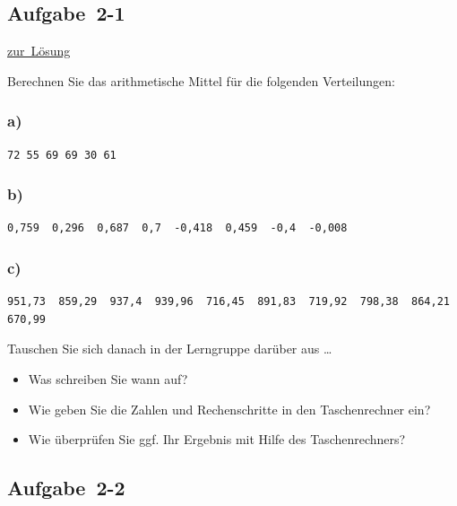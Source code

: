 \documentclass[
  11pt,
  ngerman,
  a4paper,
]{report}
\providecommand{\tightlist}{%
  \setlength{\itemsep}{0pt}\setlength{\parskip}{0pt}}
\begin{document}
\hypertarget{aufgabe-2-1}{%
\subsection{Aufgabe~2-1}\label{aufgabe-2-1}}

\protect\hyperlink{loesung-2-1}{zur~Lösung}

Berechnen Sie das arithmetische Mittel für die folgenden Verteilungen:

\hypertarget{a}{%
\subsubsection{a)}\label{a}}

\begin{verbatim}
72 55 69 69 30 61
\end{verbatim}

\hypertarget{b}{%
\subsubsection{b)}\label{b}}

\begin{verbatim}
0,759  0,296  0,687  0,7  -0,418  0,459  -0,4  -0,008
\end{verbatim}

\hypertarget{c}{%
\subsubsection{c)}\label{c}}

\begin{verbatim}
951,73  859,29  937,4  939,96  716,45  891,83  719,92  798,38  864,21  670,99
\end{verbatim}

Tauschen Sie sich danach in der Lerngruppe darüber aus \ldots{}

\begin{itemize}
\tightlist
\item
  Was schreiben Sie wann auf?
\item
  Wie geben Sie die Zahlen und Rechenschritte in den Taschenrechner ein?
\item
  Wie überprüfen Sie ggf. Ihr Ergebnis mit Hilfe des Taschenrechners?
\end{itemize}

\hypertarget{aufgabe-2-2}{%
\subsection{Aufgabe~2-2}\label{aufgabe-2-2}}
\end{document}
